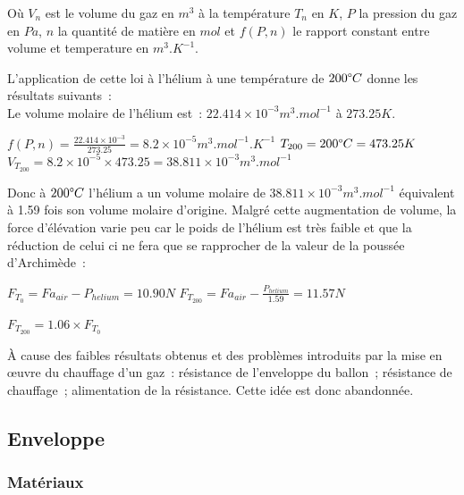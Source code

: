 \documentclass[a4paper,11pt]{article}
\begin{document}
Où $V_n$ est le volume du gaz en $m^3$ à la température $T_n$ en $K$, $P$ la pression du gaz en $Pa$, $n$ la quantité de matière en $mol$ et $f(P, n)$ le rapport constant entre volume et temperature en $m^3.K^{-1}$.

L'application de cette loi à l'hélium à une température de $200 \degree C $ donne les résultats suivants~: \\

Le volume molaire de l'hélium est~: $22.414\times 10^{-3} m^3.mol^{-1}$ à $273.25K$. \\

\begin{center}
	$\displaystyle{f(P, n) = \frac{22.414\times 10^{-3}}{273.25} = 8.2\times 10^{-5} m^3.mol^{-1}.K^{-1}}$
	\bigbreak
	$T_{200} = 200 \degree C = 473.25K$
	\medbreak
	$\displaystyle{V_{T_{200}} = 8.2\times 10^{-5} \times 473.25 = 38.811 \times 10^{-3}} m^3.mol^{-1}$
\end{center}

Donc à $200 \degree C$ l'hélium a un volume molaire de $38.811 \times 10^{-3} m^3.mol^{-1}$ équivalent à 1.59 fois son volume molaire d'origine. Malgré cette augmentation de volume, la force d'élévation varie peu car le poids de l'hélium est très faible et que la réduction de celui ci ne fera que se rapprocher de la valeur de la poussée d'Archimède~: \\

\begin{center}
  $\displaystyle{F_{T_0} = Fa_{air} - P_{helium} = 10.90 N}$
  \bigbreak
  $\displaystyle{F_{T_{200}} = Fa_{air} - \frac{P_{helium}}{1.59} = 11.57 N}$ \\
\end{center}

$F_{T_{200}} = 1.06 \times F_{T_0}$

À cause des faibles résultats obtenus et des problèmes introduits par la mise en œuvre du chauffage d'un gaz~: résistance de l'enveloppe du ballon~; résistance de chauffage~; alimentation de la résistance. Cette idée est donc abandonnée.

\subsection{Enveloppe}

\subsubsection{Matériaux}
\end{document}
